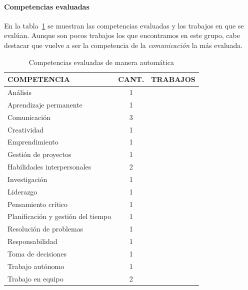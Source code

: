 \paragraph*{Competencias evaluadas}
 En la tabla~\ref{tab:CompetenciasAutomaticas} se muestran las competencias evaluadas y los trabajos en que se evalúan. Aunque son pocos trabajos los que encontramos en este grupo, cabe destacar que vuelve a ser la competencia de la \emph{comunicación} la más evaluada.

\begin{table}
  \begin{center}
  \begin{tabular}{| m{6cm} | c | m{5cm} |}
    \hline
    COMPETENCIA & CANT. & TRABAJOS\\
    \hline
    \hline
    Análisis & 1 & \cite{andre2011formal} \\
    \hline
    Aprendizaje permanente & 1 & \cite{andre2011formal}   \\
    \hline
    Comunicación & 3 & \cite{andre2011formal,rayon2014web,bedek2011behavioral}  \\
    \hline
    Creatividad & 1 & \cite{andre2011formal}   \\
    \hline
    Emprendimiento & 1 & \cite{guenaga2013serious} \\
    \hline
    Gestión de proyectos & 1 & \cite{andre2011formal} \\
    \hline
    Habilidades interpersonales & 2 & \cite{andre2011formal,rayon2014web}  \\
    \hline
    Investigación & 1 & \cite{andre2011formal}  \\
    \hline
    Liderazgo & 1 & \cite{andre2011formal}  \\
    \hline
    Pensamiento crítico & 1 & \cite{andre2011formal} \\
    \hline
    Planificación y gestión del tiempo & 1 & \cite{andre2011formal} \\
    \hline
    Resolución de problemas & 1 & \cite{guenaga2013serious} \\
    \hline
    Responsabilidad & 1 & \cite{andre2011formal}  \\
    \hline 
    Toma de decisiones & 1 & \cite{andre2011formal}   \\
    \hline
    Trabajo autónomo & 1 & \cite{andre2011formal} \\
    \hline
    Trabajo en equipo & 2 & \cite{andre2011formal,fidalgo:2015}  \\
    \hline
  \end{tabular}
\end{center}
\caption{Competencias evaluadas de manera automática}
\label{tab:CompetenciasAutomaticas}
\end{table} 

